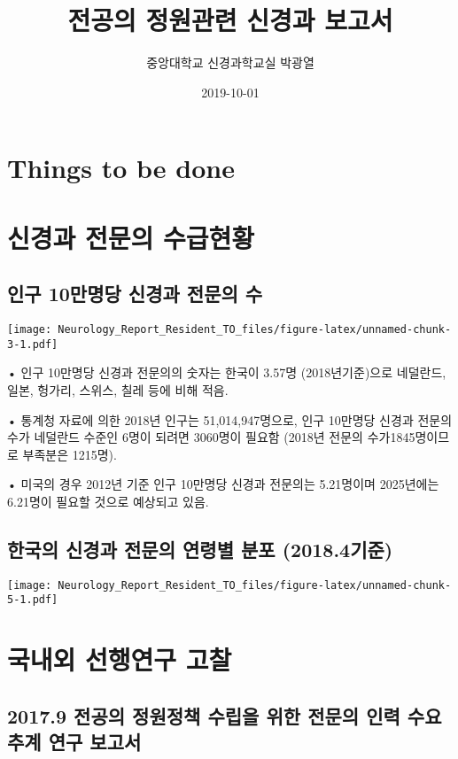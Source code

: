 \documentclass[]{book}
\title{전공의 정원관련 신경과 보고서}
\author{중앙대학교 신경과학교실 박광열}
\date{2019-10-01}
\begin{document}
\maketitle

{
\setcounter{tocdepth}{1}
\tableofcontents
}
\hypertarget{things-to-be-done}{%
\chapter*{Things to be done}\label{things-to-be-done}}

\hypertarget{DemandSupplyNeurologist}{%
\chapter{신경과 전문의 수급현황}\label{DemandSupplyNeurologist}}

\hypertarget{section}{%
\section{인구 10만명당 신경과 전문의 수}\label{section}}

\texttt{[image: Neurology\_Report\_Resident\_TO\_files/figure-latex/unnamed-chunk-3-1.pdf]}

• 인구 10만명당 신경과 전문의의 숫자는 한국이 3.57명 (2018년기준)으로 네덜란드, 일본, 헝가리, 스위스, 칠레 등에 비해 적음.

• 통계청 자료에 의한 2018년 인구는 51,014,947명으로, 인구 10만명당 신경과 전문의 수가 네덜란드 수준인 6명이 되려면 3060명이 필요함 (2018년 전문의 수가1845명이므로 부족분은 1215명).

• 미국의 경우 2012년 기준 인구 10만명당 신경과 전문의는 5.21명이며 2025년에는 6.21명이 필요할 것으로 예상되고 있음.

\hypertarget{section-1}{%
\section{한국의 신경과 전문의 연령별 분포 (2018.4기준)}\label{section-1}}

\texttt{[image: Neurology\_Report\_Resident\_TO\_files/figure-latex/unnamed-chunk-5-1.pdf]}

\hypertarget{section-2}{%
\chapter{국내외 선행연구 고찰}\label{section-2}}

\hypertarget{section-3}{%
\section{2017.9 전공의 정원정책 수립을 위한 전문의 인력 수요 추계 연구 보고서}\label{section-3}}
\end{document}
